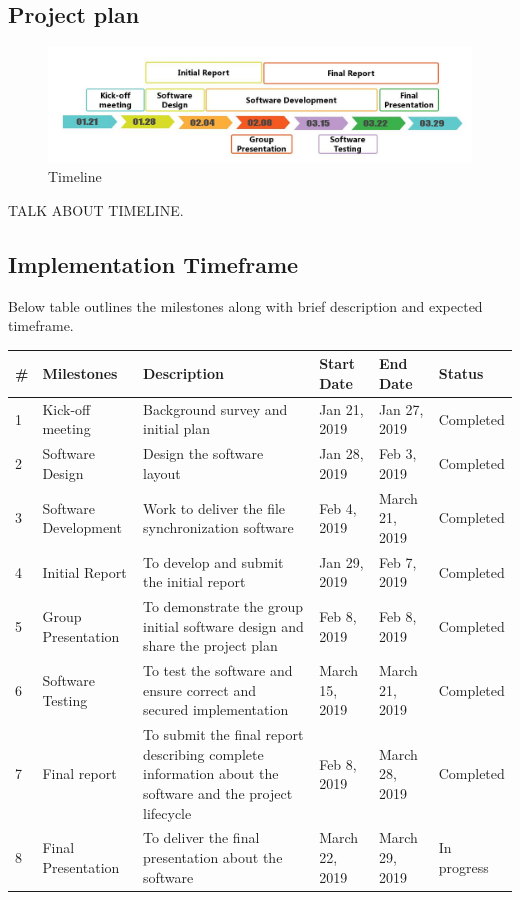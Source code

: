 \documentclass{article}
\begin{document}
\subsection{Project plan}

\begin{figure}[h]
    \centering
    \includegraphics[width=1\textwidth]{timeline}
    \caption{Timeline}
    \label{fig:timeline1}
\end{figure}

TALK ABOUT TIMELINE.

\subsection{Implementation Timeframe}
Below table outlines the milestones along with brief description and expected timeframe.

\begin{center}
\begin{tabular}{ | m{3em} | m{2cm}| m{3cm} | m{1cm} | m{1cm} | m{2cm} |}
\hline
\textbf{\#} & \textbf{Milestones} & \textbf{Description} & \textbf{Start Date} & \textbf{End Date} & \textbf{Status}  \\
\hline
1 & Kick-off meeting & Background survey and initial plan & Jan 21, 2019 & Jan 27, 2019 & Completed \\
\hline
2 & Software Design  & Design the software layout & Jan 28, 2019 & Feb 3, 2019 & Completed \\
\hline
3 & Software Development & Work to deliver the file synchronization software & Feb 4, 2019 & March 21, 2019 & Completed \\
\hline
4 & Initial Report & To develop and submit the initial report & Jan 29, 2019 & Feb 7, 2019 & Completed \\
\hline
5 & Group Presentation & To demonstrate  the group initial software design and share the project plan & Feb 8, 2019 & Feb 8, 2019 & Completed \\
\hline
6 & Software Testing &  To test the software and ensure correct and secured implementation & March 15, 2019 & March 21, 2019 & Completed \\
\hline
7 & Final report & To submit the final report describing complete information about the software and the project lifecycle & Feb 8, 2019 & March 28, 2019 & Completed \\
\hline
8 & Final Presentation & To deliver the final presentation about the software & March 22, 2019 & March 29, 2019 & In progress \\
\hline
\end{tabular}
\end{center}
\end{document}
